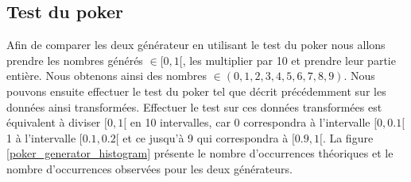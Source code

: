 \documentclass[10pt,a4paper]{article}
\begin{document}
\subsection{Test du poker}
Afin de comparer les deux générateur en utilisant le test du poker nous allons prendre les nombres générés $\in [0,1[$, les multiplier par 10 et prendre leur partie entière. Nous obtenons ainsi des nombres $\in (0,1,2,3,4,5,6,7,8,9)$. Nous pouvons ensuite effectuer le test du poker tel que décrit précédemment sur les données ainsi transformées. Effectuer le test sur ces données transformées est équivalent à diviser $[0,1[$ en 10 intervalles, car 0 correspondra à l'intervalle $[0,0.1[$ 1 à l'intervalle $[0.1,0.2[$ et ce jusqu'à 9 qui correspondra à $[0.9,1[$.\newline \newline
La figure \ref{poker_generator_histogram} présente le nombre d'occurrences théoriques et le nombre d'occurrences observées pour les deux générateurs.
\end{document}

